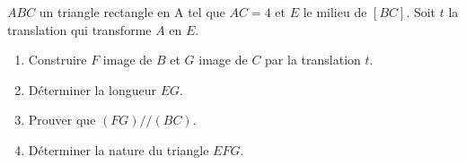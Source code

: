 \documentclass[a4paper,12pt]{article}
\begin{document}
\begin{exo}
$ABC$ un triangle rectangle en A tel que $AC=4 $ et $E$ le milieu de $[BC]$. Soit $t$ la translation qui transforme $A$ en $E$.
\begin{enumerate}
\item Construire $F$ image de $B$ et $G$ image de $C$ par la translation $t$.
\item Déterminer la longueur $EG$.
\item Prouver que $(FG)//(BC)$.
\item Déterminer la nature du triangle $EFG$. 
\end{enumerate}
\end{exo}
\end{document}
